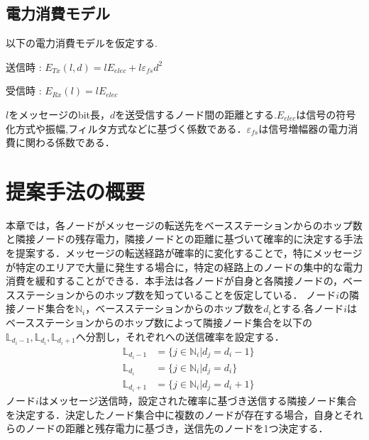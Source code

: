 \documentclass[a4j,10pt]{jarticle}
\begin{document}
\subsection{電力消費モデル}
以下の電力消費モデルを仮定する.\par
\vspace{2mm}
 \hspace{6mm} 送信時 : \hspace{3mm} $E_{Tx}(l,d)=lE_{elec}+l \varepsilon_{fs}d^2$ \par
 \hspace{6mm} 受信時 : \hspace{3mm} $E_{Rx}(l)=lE_{elec}$ \par
\vspace{2mm}
$l$をメッセージのbit長，$d$を送受信するノード間の距離とする.$E_{elec}$は信号の符号化方式や振幅,フィルタ方式などに基づく係数である．$\varepsilon_{fs}$は信号増幅器の電力消費に関わる係数である．











\section{提案手法の概要}
本章では，各ノードがメッセージの転送先をベースステーションからのホップ数と隣接ノードの残存電力，隣接ノードとの距離に基づいて確率的に決定する手法を提案する．メッセージの転送経路が確率的に変化することで，特にメッセージが特定のエリアで大量に発生する場合に，特定の経路上のノードの集中的な電力消費を緩和することができる．本手法は各ノードが自身と各隣接ノードの，ベースステーションからのホップ数を知っていることを仮定している．
ノード$i$の隣接ノード集合を$\mathbb{N}_i$，ベースステーションからのホップ数を$d_i$とする.各ノード$i$はベースステーションからのホップ数によって隣接ノード集合を以下の$\mathbb{L}_{d_i-1},\mathbb{L}_{d_i},\mathbb{L}_{d_i+1}$へ分割し，それぞれへの送信確率を設定する．
\begin{eqnarray*}
& \mathbb{L}_{d_i-1} & = \{j \in \mathbb{N}_i | d_{j} = d_{i}-1 \} \\
& \mathbb{L}_{d_i} & = \{j \in \mathbb{N}_i | d_{j} = d_{i} \} \\
& \mathbb{L}_{d_i+1} & = \{j \in \mathbb{N}_i | d_{j} = d_{i}+1 \}
\end{eqnarray*}
ノード$i$はメッセージ送信時，設定された確率に基づき送信する隣接ノード集合を決定する．決定したノード集合中に複数のノードが存在する場合，自身とそれらのノードの距離と残存電力に基づき，送信先のノードを1つ決定する．
\end{document}
